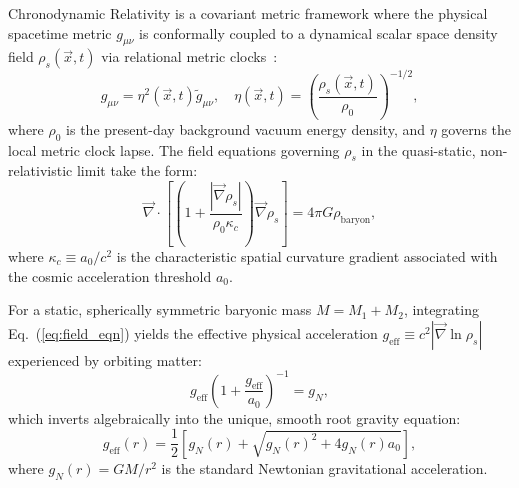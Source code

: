 \documentclass[aps,prd,reprint,superscriptaddress,nofootinbib,floatfix,amsmath,amssymb]{revtex4-2}
\begin{document}
Chronodynamic Relativity is a covariant metric framework where the physical spacetime metric $g_{\mu\nu}$ is conformally coupled to a dynamical scalar space density field $\rho_s(\vec{x}, t)$ via relational metric clocks~\cite{shreve2026foundations,shreve2026temporal}:
\begin{equation}
g_{\mu\nu} = \eta^2(\vec{x}, t) \tilde{g}_{\mu\nu}, \quad \eta(\vec{x}, t) = \left(\frac{\rho_s(\vec{x}, t)}{\rho_0}\right)^{-1/2},
\end{equation}
where $\rho_0$ is the present-day background vacuum energy density, and $\eta$ governs the local metric clock lapse. The field equations governing $\rho_s$ in the quasi-static, non-relativistic limit take the form:
\begin{equation}
\vec{\nabla} \cdot \left[ \left(1 + \frac{|\vec{\nabla}\rho_s|}{\rho_0 \kappa_c}\right) \vec{\nabla}\rho_s \right] = 4\pi G \rho_{\text{baryon}},
\label{eq:field_eqn}
\end{equation}
where $\kappa_c \equiv a_0 / c^2$ is the characteristic spatial curvature gradient associated with the cosmic acceleration threshold $a_0$.

For a static, spherically symmetric baryonic mass $M = M_1 + M_2$, integrating Eq.~(\ref{eq:field_eqn}) yields the effective physical acceleration $g_{\text{eff}} \equiv c^2 |\vec{\nabla}\ln\rho_s|$ experienced by orbiting matter:
\begin{equation}
g_{\text{eff}} \left(1 + \frac{g_{\text{eff}}}{a_0}\right)^{-1} = g_N,
\end{equation}
which inverts algebraically into the unique, smooth root gravity equation:
\begin{equation}
g_{\text{eff}}(r) = \frac{1}{2} \left[ g_N(r) + \sqrt{g_N(r)^2 + 4 g_N(r) a_0} \right],
\label{eq:g_eff}
\end{equation}
where $g_N(r) = G M / r^2$ is the standard Newtonian gravitational acceleration.
\end{document}
